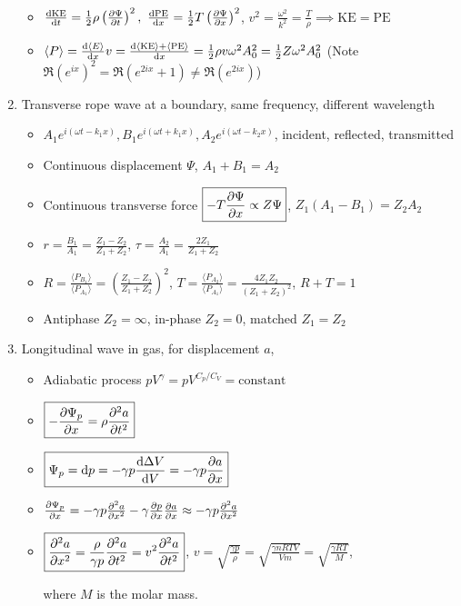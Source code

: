 \documentclass{article}
\theoremstyle{remark}
\theoremstyle{remark}
\newcommand{\where}[1]{\begin{flushright}where #1.\end{flushright}}
\newcommand{\realp}[1]{\mathfrak{R}(#1)}
\begin{document}
\begin{enumerate}
\begin{itemize}
        \item $\dv{\text{KE}}{t} = \frac{1}{2}\rho\left(\pdv{\Psi}{t}\right)^2,\ \dv{\text{PE}}{x}=\frac{1}{2}T\left(\pdv{\Psi}{x}\right)^2 $, $v^2=\frac{\omega^2}{k^2}=\frac{T}{\rho}\implies \text{KE}=\text{PE} $
        \item $\langle P\rangle = \dv{\langle E\rangle}{x} v = \dv{\langle\text{KE}\rangle+\langle\text{PE}\rangle}{x} = \frac{1}{2}\rho v\omega^2A_0^2 = \frac{1}{2}Z\omega^2A_0^2 $ 
        (Note $\displaystyle\realp{e^{ix}}^2 = \realp{e^{2ix}+1}\neq\realp{e^{2ix}}$)
    \end{itemize}
    \item Transverse rope wave at a boundary, same frequency, different wavelength\begin{itemize}
        \item $A_1e^{i(\omega t-k_1x)}, B_1e^{i(\omega t+k_1x)}, A_2e^{i(\omega t-k_2x)}$, incident, reflected, transmitted
        \item Continuous displacement $\Psi$, $A_1+B_1 = A_2$
        \item Continuous transverse force $\boxed{-T\pdv{\Psi}{x}\propto Z\Psi}$, $Z_1(A_1-B_1)=Z_2A_2 $
        \item $r = \frac{B_1}{A_1}=\frac{Z_1-Z_2}{Z_1+Z_2} $, $\tau = \frac{A_2}{A_1}=\frac{2Z_1}{Z_1+Z_2} $
        \item $R = \frac{\langle P_{B_1}\rangle}{\langle P_{A_1}\rangle} = \left(\frac{Z_1-Z_2}{Z_1+Z_2}\right)^2$, $T = \frac{\langle P_{A_2}\rangle}{\langle P_{A_1}\rangle} = \frac{4Z_1Z_2}{(Z_1+Z_2)^2} $, $R+T=1$
        \item Antiphase $Z_2=\infty $, in-phase $Z_2 = 0$, matched $Z_1=Z_2$
    \end{itemize}
    \item Longitudinal wave in gas, for displacement $a$,\begin{itemize}
        \item Adiabatic process $pV^\gamma = pV^{C_p/C_V} = \text{constant}$
        \item $\boxed{-\pdv{\Psi_p}{x} = \rho\pdv[2]{a}{t}}$
        \item $\boxed{\Psi_p = \dd p = -\gamma p\dv{\Delta V}{V} = -\gamma p\pdv{a}{x}}$
        \item $\pdv{\Psi_p}{x}=-\gamma p\pdv[2]{a}{x} - \gamma\pdv{p}{x}\pdv{a}{x}\approx -\gamma p\pdv[2]{a}{x}$
        \item $\boxed{\pdv[2]{a}{x} = \frac{\rho}{\gamma p}\pdv[2]{a}{t} = v^2\pdv[2]{a}{t}}$, $v=\sqrt{\frac{\gamma p}{\rho}} = \sqrt{\frac{\gamma nRTV}{Vm}}=\sqrt{\frac{\gamma RT}{M}}$, \where{$M$ is the molar mass}

\end{itemize}
\end{enumerate}
\end{document}
